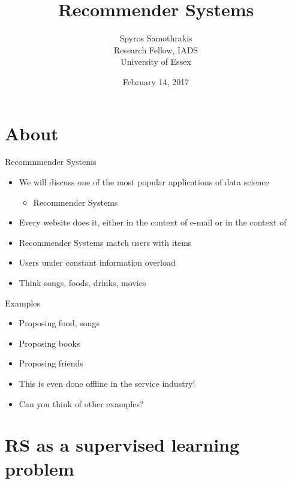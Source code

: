 \documentclass[obeyspaces]{beamer}
\title{Recommender Systems}
\author{Spyros Samothrakis\\
 Research Fellow, IADS\\
 University of Essex}
\date{February 14, 2017}
\providecommand{\tightlist}{%
  \setlength{\itemsep}{0pt}\setlength{\parskip}{0pt}}
\begin{document}
\frame{\titlepage}

\begin{frame}
\tableofcontents[hideallsubsections]
\end{frame}

\section{About}\label{about}

\begin{frame}{Recommmender Systems}

\begin{itemize}
\tightlist
\item
  We will discuss one of the most popular applications of data science

  \begin{itemize}
  \tightlist
  \item
    Recommender Systems
  \end{itemize}
\item
  Every website does it, either in the context of e-mail or in the
  context of
\item
  Recommender Systems match users with items
\item
  Users under constant information overload
\item
  Think songs, foods, drinks, movies
\end{itemize}

\end{frame}

\begin{frame}{Examples}

\begin{itemize}
\tightlist
\item
  Proposing food, songs
\item
  Proposing books
\item
  Proposing friends
\item
  This is even done offline in the service industry!
\item
  Can you think of other examples?
\end{itemize}

\end{frame}

\section{RS as a supervised learning
problem}\label{rs-as-a-supervised-learning-problem}
\end{document}
